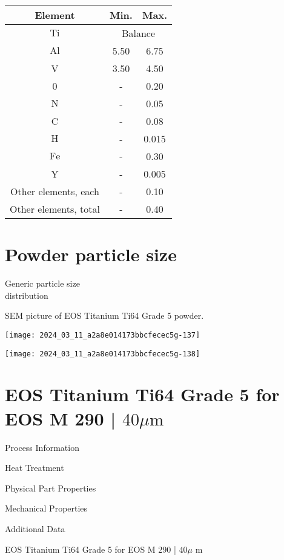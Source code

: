 \documentclass[10pt]{article}
\begin{document}
\begin{center}
\begin{tabular}{|c|c|c|}
\hline
Element & Min. & Max. \\
\hline
$\mathrm{Ti}$ & \multicolumn{2}{|c|}{Balance} \\
\hline
$\mathrm{Al}$ & 5.50 & 6.75 \\
\hline
V & 3.50 & 4.50 \\
\hline
0 & - & 0.20 \\
\hline
$\mathrm{N}$ & - & 0.05 \\
\hline
C & - & 0.08 \\
\hline
$\mathrm{H}$ & - & 0.015 \\
\hline
$\mathrm{Fe}$ & - & 0.30 \\
\hline
Y & - & 0.005 \\
\hline
Other elements, each & - & 0.10 \\
\hline
Other elements, total & - & 0.40 \\
\hline
\end{tabular}
\end{center}

\section*{Powder particle size}
Generic particle size\\
distribution

SEM picture of EOS Titanium Ti64 Grade 5 powder.

\begin{center}
\texttt{[image: 2024\_03\_11\_a2a8e014173bbcfecec5g-137]}
\end{center}

\begin{center}
\texttt{[image: 2024\_03\_11\_a2a8e014173bbcfecec5g-138]}
\end{center}

\section*{EOS Titanium Ti64 Grade 5 for EOS M 290 | $40 \mu \mathrm{m}$}
Process Information

Heat Treatment

Physical Part Properties

Mechanical Properties

Additional Data

EOS Titanium Ti64 Grade 5 for EOS M 290 | $40 \mu$ m
\end{document}
